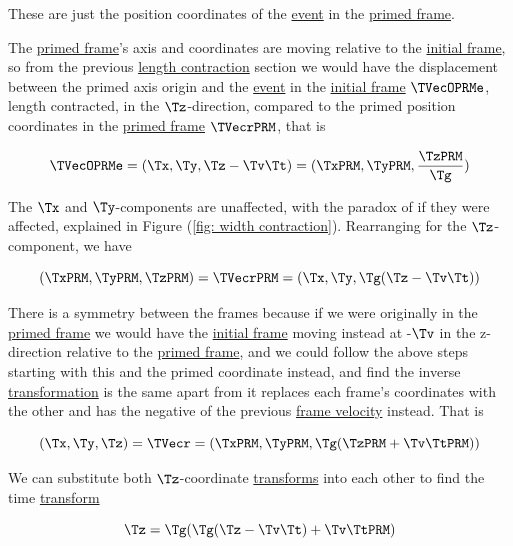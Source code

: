 These are just the position coordinates of the \hyperlink{def-event}{event} in the \hyperlink{def-Primed-Frame}{primed frame}.

The \hyperlink{def-Primed-Frame}{primed frame}'s axis and coordinates are moving relative to the \hyperlink{def-initial-Frame}{initial frame}, so from the previous \hyperlink{def-length-contraction}{length contraction} section we would have the displacement between the primed axis origin and the \hyperlink{def-event}{event} in the \hyperlink{def-initial-Frame}{initial frame} $\TVecOPRMe$, length contracted, in the $\Tz $-direction, compared to the primed position coordinates in the \hyperlink{def-Primed-Frame}{primed frame} ${\TVecrPRM  }$, that is

\begin{equation}
	\TVecOPRMe = ({\Tx },{\Ty },{\Tz }-{\Tv }{\Tt }) = ({\TxPRM  },{\TyPRM  },\frac{\TzPRM  }{\Tg })
\end{equation}

The $\Tx $ and $\Ty $-components are unaffected, with the paradox of if they were affected, explained in Figure (\ref{fig: width contraction}).
Rearranging for the $\Tz $-component, we have

\begin{equation}
	({\TxPRM  },{\TyPRM  },{\TzPRM  }) = {\TVecrPRM  } = ({\Tx },{\Ty },{\Tg }({\Tz }-{\Tv }{\Tt }) )
\end{equation}

There is a symmetry between the frames because if we were originally in the \hyperlink{def-Primed-Frame}{primed frame} we would have the \hyperlink{def-initial-Frame}{initial frame} moving instead at -${\Tv }$ in the z-direction relative to the \hyperlink{def-Primed-Frame}{primed frame}, and we could follow the above steps starting with this and the primed coordinate instead, and find the inverse \hyperlink{def-transform}{transformation} is the same apart from it replaces each frame's coordinates with the other and has the negative of the previous \hyperlink{def-frame-velocity}{frame velocity} instead.
That is

\begin{equation}
	({\Tx },{\Ty },{\Tz }) = {\TVecr  } = ({\TxPRM  },{\TyPRM  },{\Tg }({\TzPRM  }+{\Tv }\TtPRM ) )
\end{equation}

We can substitute both $\Tz $-coordinate \hyperlink{def-transform}{transforms} into each other to find the time \hyperlink{def-transform}{transform}

\begin{equation}
	{\Tz } = \Tg  ( \Tg  ({\Tz }-{\Tv }{\Tt }) + {\Tv } \TtPRM )
\end{equation}

